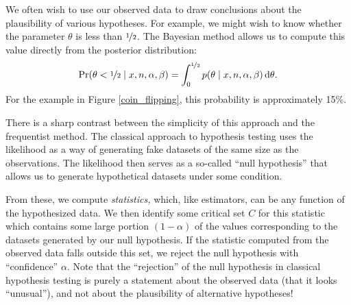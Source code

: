\documentclass{article}
\newcommand{\given}{\mid}
\newcommand{\intd}[1]{\,\mathrm{d}{#1}}
\begin{document}
We often wish to use our observed data to draw conclusions about the
plausibility of various hypotheses.  For example, we might wish to
know whether the parameter $\theta$ is less than $\nicefrac{1}{2}$.
The Bayesian method allows us to compute this value directly from the
posterior distribution:
\begin{equation*}
  \Pr(\theta < \nicefrac{1}{2} \given x, n, \alpha, \beta)
  =
  \int_{0}^{\nicefrac{1}{2}} p(\theta \given x, n, \alpha, \beta) \intd{\theta}.
\end{equation*}
For the example in Figure \ref{coin_flipping}, this probability is
approximately 15\%.

There is a sharp contrast between the simplicity of this approach and
the frequentist method.  The classical approach to hypothesis testing
uses the likelihood as a way of generating fake datasets of the same
size as the observations.  The likelihood then serves as a so-called
``null hypothesis'' that allows us to generate hypothetical datasets
under some condition.

From these, we compute \emph{statistics,} which, like estimators, can
be any function of the hypothesized data.  We then identify some
critical set $C$ for this statistic which contains some large portion
$(1 - \alpha)$ of the values corresponding to the datasets generated
by our null hypothesis.  If the statistic computed from the observed
data falls outside this set, we reject the null hypothesis with
``confidence'' $\alpha$.  Note that the ``rejection'' of the null
hypothesis in classical hypothesis testing is purely a statement about
the observed data (that it looks ``unusual''), and not about the
plausibility of alternative hypotheses!
\end{document}

